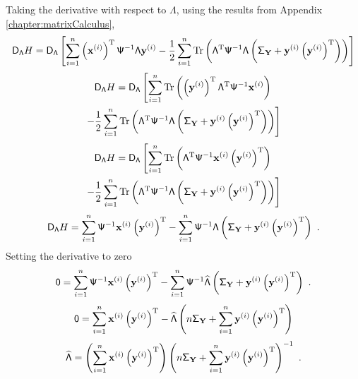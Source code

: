 \documentclass[12pt]{report}
\DeclareMathOperator{\trace}{Tr}
\newcommand{\T}{^\textup{T}}
\newcommand{\vect}[1]{\mathbf{#1}}
\newcommand{\matr}[1]{\mathsf{#1}}
\begin{document}
Taking the derivative with respect to $\matr{\Lambda}$, using the results from Appendix \ref{chapter:matrixCalculus},
\begin{equation*}
\matr{D}_{\matr{\Lambda}}H=
\matr{D}_{\matr{\Lambda}}\left[
\sum_{i=1}^n\left(\vect{x}^{(i)}\right)\T\matr{\Psi}^{-1}\matr{\Lambda}\vect{y}^{(i)}
-\frac{1}{2}\sum_{i=1}^{n}\trace\left(\matr{\Lambda}\T\matr{\Psi}^{-1}\matr{\Lambda}\left(\matr{\Sigma}_{\vect{Y}}+\vect{y}^{(i)}\left(\vect{y}^{(i)}\right)\T\right)\right)
\right]
\end{equation*}
\begin{multline*}
\matr{D}_{\matr{\Lambda}}H=
\matr{D}_{\matr{\Lambda}}\left[
\sum_{i=1}^n\trace\left(\left(\vect{y}^{(i)}\right)\T\matr{\Lambda}\T\matr{\Psi}^{-1}\vect{x}^{(i)}\right)
\right.
\\
\left.
-\frac{1}{2}\sum_{i=1}^{n}\trace\left(\matr{\Lambda}\T\matr{\Psi}^{-1}\matr{\Lambda}\left(\matr{\Sigma}_{\vect{Y}}+\vect{y}^{(i)}\left(\vect{y}^{(i)}\right)\T\right)\right)
\right]
\end{multline*}
\begin{multline*}
\matr{D}_{\matr{\Lambda}}H=
\matr{D}_{\matr{\Lambda}}\left[
\sum_{i=1}^n\trace\left(\matr{\Lambda}\T\matr{\Psi}^{-1}\vect{x}^{(i)}\left(\vect{y}^{(i)}\right)\T\right)
\right.
\\
\left.
-\frac{1}{2}\sum_{i=1}^{n}\trace\left(\matr{\Lambda}\T\matr{\Psi}^{-1}\matr{\Lambda}\left(\matr{\Sigma}_{\vect{Y}}+\vect{y}^{(i)}\left(\vect{y}^{(i)}\right)\T\right)\right)
\right]
\end{multline*}
\begin{equation*}
\matr{D}_{\matr{\Lambda}}H=
\sum_{i=1}^n\matr{\Psi}^{-1}\vect{x}^{(i)}\left(\vect{y}^{(i)}\right)\T
-\sum_{i=1}^{n}\matr{\Psi}^{-1}\matr{\Lambda}\left(\matr{\Sigma}_{\vect{Y}}+\vect{y}^{(i)}\left(\vect{y}^{(i)}\right)\T\right) \ .
\end{equation*}
Setting the derivative to zero
\begin{equation*}
\matr{0}=
\sum_{i=1}^n\matr{\Psi}^{-1}\vect{x}^{(i)}\left(\vect{y}^{(i)}\right)\T
-\sum_{i=1}^{n}\matr{\Psi}^{-1}\widehat{\matr{\Lambda}}\left(\matr{\Sigma}_{\vect{Y}}+\vect{y}^{(i)}\left(\vect{y}^{(i)}\right)\T\right) \ .
\end{equation*}
\begin{equation*}
\matr{0}=
\sum_{i=1}^n\vect{x}^{(i)}\left(\vect{y}^{(i)}\right)\T
-\widehat{\matr{\Lambda}}\left(n\matr{\Sigma}_{\vect{Y}}+\sum_{i=1}^{n}\vect{y}^{(i)}\left(\vect{y}^{(i)}\right)\T\right)
\end{equation*}
\begin{equation}
\widehat{\matr{\Lambda}}
=
\left(\sum_{i=1}^n\vect{x}^{(i)}\left(\vect{y}^{(i)}\right)\T\right)\left(n\matr{\Sigma}_{\vect{Y}}+\sum_{i=1}^{n}\vect{y}^{(i)}\left(\vect{y}^{(i)}\right)\T\right)^{-1}\ .
\end{equation}
\end{document}
